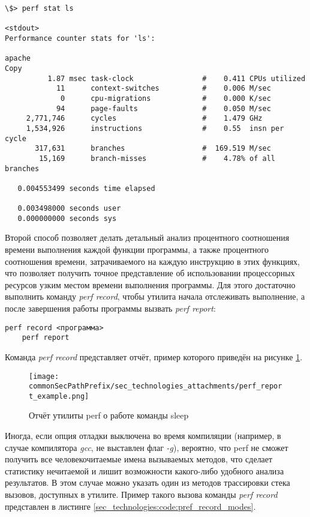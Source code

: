 \begin{lstlisting}[style=CodeListing]
\$> perf stat ls

<stdout>
Performance counter stats for 'ls':

apache
Copy
          1.87 msec task-clock                #    0.411 CPUs utilized
            11      context-switches          #    0.006 M/sec
             0      cpu-migrations            #    0.000 K/sec
            94      page-faults               #    0.050 M/sec
     2,771,746      cycles                    #    1.479 GHz
     1,534,926      instructions              #    0.55  insn per cycle
       317,631      branches                  #  169.519 M/sec
        15,169      branch-misses             #    4.78% of all branches

   0.004553499 seconds time elapsed

   0.003498000 seconds user
   0.000000000 seconds sys
\end{lstlisting}

Второй способ позволяет делать детальный анализ процентного соотношения времени выполнения каждой функции программы, 
а также процентного соотношения времени, затрачиваемого на каждую инструкцию в этих функциях, что позволяет 
получить точное представление об использовании процессорных ресурсов узким местом времени выполнения программы. Для этого
достаточно выполнить команду \textit{perf record}, чтобы утилита начала отслеживать выполнение, а после завершения работы программы
вызвать \textit{perf report}:

\begin{lstlisting}[style=CodeListing]
    perf record <программа>
    perf report
\end{lstlisting}

Команда \textit{perf record} представляет отчёт, пример которого приведён на рисунке \ref{sec_technologies:fig:perf_report_example}.
\begin{figure}[ht]
    \centering
    \texttt{[image: \\commonSecPathPrefix/sec\_technologies\_attachments/perf\_report\_example.png]}
    \caption{Отчёт утилиты perf о работе команды sleep}
    \label{sec_technologies:fig:perf_report_example}
\end{figure}

Иногда, если опция отладки выключена во время компиляции (например, в случае компилятора \textit{gcc}, не выставлен флаг \textit{-g}),
вероятно, что perf не сможет получить все человекочитаемые имена вызываемых методов, что сделает статистику 
нечитаемой и лишит возможности какого-либо удобного анализа результатов. 
В этом случае можно указать один из методов трассировки стека вызовов, доступных в утилите.
Пример такого вызова команды \textit{perf record} представлен в листинге \ref{sec_technologies:code:pref_record_modes}.

